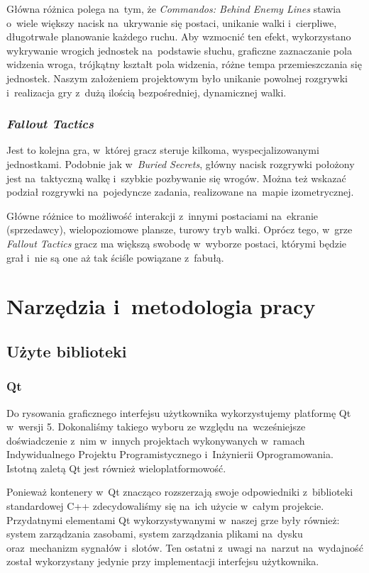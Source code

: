 \documentclass[licencjacka]{pracamgr}
\begin{document}
      Główna różnica polega na~tym, że \emph{Commandos: Behind Enemy Lines} stawia o~wiele większy nacisk na~ukrywanie się postaci, unikanie walki
      i~cierpliwe, długotrwałe planowanie każdego ruchu. Aby wzmocnić ten efekt, wykorzystano wykrywanie wrogich jednostek na~podstawie słuchu,
      graficzne zaznaczanie pola widzenia wroga, trójkątny kształt pola widzenia, różne tempa przemieszczania się jednostek.
      Naszym założeniem projektowym było unikanie powolnej rozgrywki i~realizacja gry z~dużą ilością bezpośredniej, dynamicznej walki.

    \subsection{\emph{Fallout Tactics}}
      Jest to kolejna gra, w~której gracz steruje kilkoma, wyspecjalizowanymi jednostkami. Podobnie jak w~\emph{Buried Secrets}, główny nacisk rozgrywki
      położony jest na~taktyczną walkę i~szybkie pozbywanie się wrogów. Można też wskazać podział rozgrywki na~pojedyncze zadania,
      realizowane na~mapie izometrycznej.

      Główne różnice to możliwość interakcji z~innymi postaciami na~ekranie (sprzedawcy), wielopoziomowe plansze, turowy tryb walki. Oprócz tego,
      w~grze \emph{Fallout Tactics} gracz ma większą swobodę w~wyborze postaci, którymi będzie grał i~nie są one aż tak ściśle powiązane z~fabułą.

\chapter{Narzędzia i~metodologia pracy}
  \section{Użyte biblioteki}
    \subsection{Qt}
      Do rysowania graficznego interfejsu użytkownika wykorzystujemy platformę Qt\cite{QT} w~wersji 5. Dokonaliśmy takiego wyboru
      ze względu na~wcześniejsze doświadczenie z~nim w~innych projektach wykonywanych w~ramach Indywidualnego Projektu Programistycznego
      i~Inżynierii Oprogramowania. Istotną zaletą Qt jest również wieloplatformowość.

      Ponieważ kontenery w~Qt znacząco rozszerzają swoje odpowiedniki z~biblioteki standardowej C++ zdecydowaliśmy się na~ich użycie
      w~całym projekcie. Przydatnymi elementami Qt wykorzystywanymi w~naszej grze były również: system zarządzania zasobami,
      system zarządzania plikami na~dysku oraz~mechanizm sygnałów i~slotów. Ten ostatni z~uwagi na~narzut na~wydajność został 
      wykorzystany jedynie przy implementacji interfejsu użytkownika.
\end{document}
